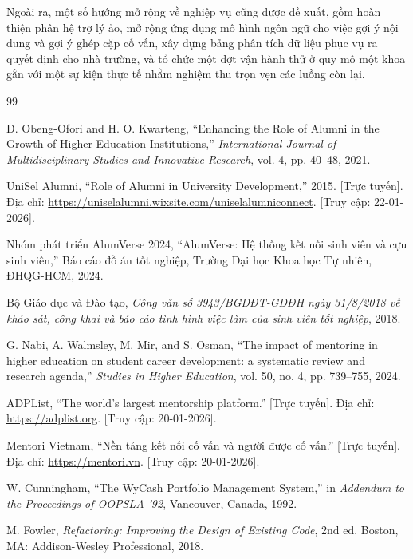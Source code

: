 \documentclass[12pt,a4paper,oneside]{report}
\begin{document}
Ngoài ra, một số hướng mở rộng về nghiệp vụ cũng được đề xuất, gồm hoàn thiện phân hệ trợ lý ảo, mở rộng ứng dụng mô hình ngôn ngữ cho việc gợi ý nội dung và gợi ý ghép cặp cố vấn, xây dựng bảng phân tích dữ liệu phục vụ ra quyết định cho nhà trường, và tổ chức một đợt vận hành thử ở quy mô một khoa gắn với một sự kiện thực tế nhằm nghiệm thu trọn vẹn các luồng còn lại.

\begin{thebibliography}{99}

 D. Obeng-Ofori and H. O. Kwarteng, ``Enhancing the Role of Alumni in the Growth of Higher Education Institutions,'' \textit{International Journal of Multidisciplinary Studies and Innovative Research}, vol. 4, pp. 40--48, 2021.

 UniSel Alumni, ``Role of Alumni in University Development,'' 2015. [Trực tuyến]. Địa chỉ: \url{https://uniselalumni.wixsite.com/uniselalumniconnect}. [Truy cập: 22-01-2026].

 Nhóm phát triển AlumVerse 2024, ``AlumVerse: Hệ thống kết nối sinh viên và cựu sinh viên,'' Báo cáo đồ án tốt nghiệp, Trường Đại học Khoa học Tự nhiên, ĐHQG-HCM, 2024.

 Bộ Giáo dục và Đào tạo, \textit{Công văn số 3943/BGDĐT-GDĐH ngày 31/8/2018 về khảo sát, công khai và báo cáo tình hình việc làm của sinh viên tốt nghiệp}, 2018.

 G. Nabi, A. Walmsley, M. Mir, and S. Osman, ``The impact of mentoring in higher education on student career development: a systematic review and research agenda,'' \textit{Studies in Higher Education}, vol. 50, no. 4, pp. 739--755, 2024.

 ADPList, ``The world's largest mentorship platform.'' [Trực tuyến]. Địa chỉ: \url{https://adplist.org}. [Truy cập: 20-01-2026].

 Mentori Vietnam, ``Nền tảng kết nối cố vấn và người được cố vấn.'' [Trực tuyến]. Địa chỉ: \url{https://mentori.vn}. [Truy cập: 20-01-2026].

 W. Cunningham, ``The WyCash Portfolio Management System,'' in \textit{Addendum to the Proceedings of OOPSLA '92}, Vancouver, Canada, 1992.

 M. Fowler, \textit{Refactoring: Improving the Design of Existing Code}, 2nd ed. Boston, MA: Addison-Wesley Professional, 2018.


\end{thebibliography}
\end{document}
